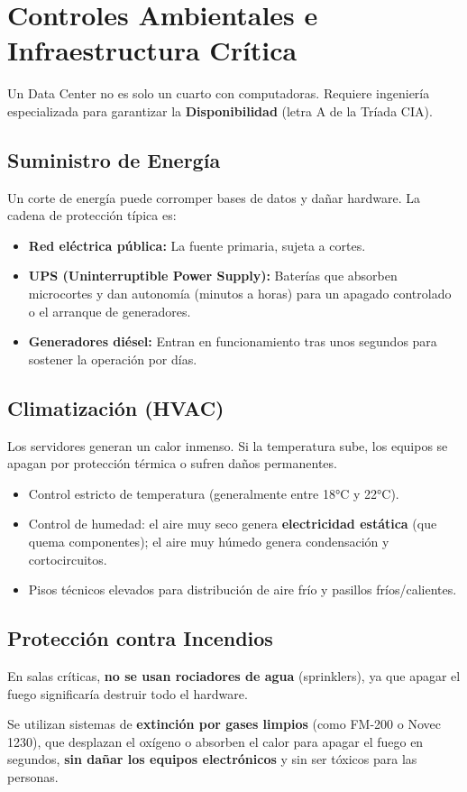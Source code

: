 \documentclass[11pt,a4paper]{article}
\begin{document}
\section{Controles Ambientales e Infraestructura Crítica}
Un Data Center no es solo un cuarto con computadoras. Requiere ingeniería especializada para garantizar la \textbf{Disponibilidad} (letra A de la Tríada CIA).

\subsection{Suministro de Energía}
Un corte de energía puede corromper bases de datos y dañar hardware. La cadena de protección típica es:
\begin{itemize}[leftmargin=*]
  \item \textbf{Red eléctrica pública:} La fuente primaria, sujeta a cortes.
  \item \textbf{UPS (Uninterruptible Power Supply):} Baterías que absorben microcortes y dan autonomía (minutos a horas) para un apagado controlado o el arranque de generadores.
  \item \textbf{Generadores diésel:} Entran en funcionamiento tras unos segundos para sostener la operación por días.
\end{itemize}

\subsection{Climatización (HVAC)}
Los servidores generan un calor inmenso. Si la temperatura sube, los equipos se apagan por protección térmica o sufren daños permanentes.
\begin{itemize}[leftmargin=*]
  \item Control estricto de temperatura (generalmente entre 18°C y 22°C).
  \item Control de humedad: el aire muy seco genera \textbf{electricidad estática} (que quema componentes); el aire muy húmedo genera condensación y cortocircuitos.
  \item Pisos técnicos elevados para distribución de aire frío y pasillos fríos/calientes.
\end{itemize}

\subsection{Protección contra Incendios}
\begin{alerta}
En salas críticas, \textbf{no se usan rociadores de agua} (sprinklers), ya que apagar el fuego significaría destruir todo el hardware.
\end{alerta}
Se utilizan sistemas de \textbf{extinción por gases limpios} (como FM-200 o Novec 1230), que desplazan el oxígeno o absorben el calor para apagar el fuego en segundos, \textbf{sin dañar los equipos electrónicos} y sin ser tóxicos para las personas.
\end{document}
